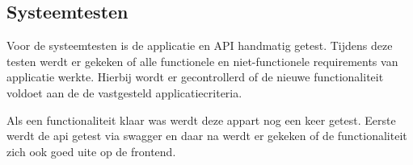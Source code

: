 \subsection{Systeemtesten}
Voor de systeemtesten is de applicatie en API handmatig getest.
Tijdens deze testen werdt er gekeken of alle functionele en niet-functionele requirements van applicatie werkte.
Hierbij wordt er gecontrollerd of de nieuwe functionaliteit voldoet aan de de vastgesteld applicatiecriteria.

\whitespace
Als een functionaliteit klaar was werdt deze appart nog een keer getest.
Eerste werdt de api getest via swagger en daar na werdt er gekeken of de functionaliteit zich ook goed uite op de frontend.

\whitespace
{}

